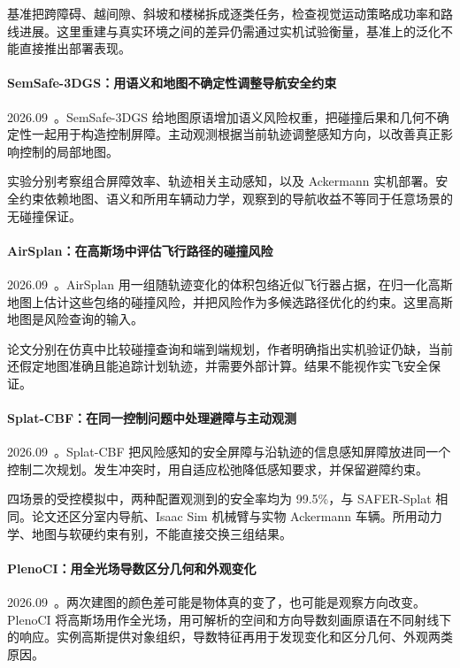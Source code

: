 基准把跨障碍、越间隙、斜坡和楼梯拆成逐类任务，检查视觉运动策略成功率和路线进展。这里重建与真实环境之间的差异仍需通过实机试验衡量，基准上的泛化不能直接推出部署表现。

\paragraph{SemSafe-3DGS：用语义和地图不确定性调整导航安全约束}
2026.09~\cite{2609_19330}。SemSafe-3DGS 给地图原语增加语义风险权重，把碰撞后果和几何不确定性一起用于构造控制屏障。主动观测根据当前轨迹调整感知方向，以改善真正影响控制的局部地图。

实验分别考察组合屏障效率、轨迹相关主动感知，以及 Ackermann 实机部署。安全约束依赖地图、语义和所用车辆动力学，观察到的导航收益不等同于任意场景的无碰撞保证。

\paragraph{AirSplan：在高斯场中评估飞行路径的碰撞风险}
2026.09~\cite{2609_21226}。AirSplan 用一组随轨迹变化的体积包络近似飞行器占据，在归一化高斯地图上估计这些包络的碰撞风险，并把风险作为多候选路径优化的约束。这里高斯地图是风险查询的输入。

论文分别在仿真中比较碰撞查询和端到端规划，作者明确指出实机验证仍缺，当前还假定地图准确且能追踪计划轨迹，并需要外部计算。结果不能视作实飞安全保证。

\paragraph{Splat-CBF：在同一控制问题中处理避障与主动观测}
2026.09~\cite{2609_23100}。Splat-CBF 把风险感知的安全屏障与沿轨迹的信息感知屏障放进同一个控制二次规划。发生冲突时，用自适应松弛降低感知要求，并保留避障约束。

四场景的受控模拟中，两种配置观测到的安全率均为 99.5\%，与 SAFER-Splat 相同。论文还区分室内导航、Isaac Sim 机械臂与实物 Ackermann 车辆。所用动力学、地图与软硬约束有别，不能直接交换三组结果。

\paragraph{PlenoCI：用全光场导数区分几何和外观变化}
2026.09~\cite{2609_28930}。两次建图的颜色差可能是物体真的变了，也可能是观察方向改变。PlenoCI 将高斯场用作全光场，用可解析的空间和方向导数刻画原语在不同射线下的响应。实例高斯提供对象组织，导数特征再用于发现变化和区分几何、外观两类原因。

